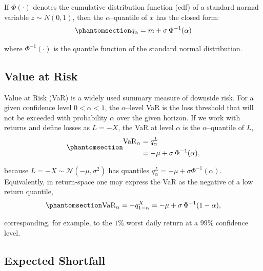 \documentclass[
  letterpaper,
  DIV=11,
  numbers=noendperiod]{scrreprt}
\begin{document}
If \(\Phi(\cdot)\) denotes the cumulative distribution function (cdf) of
a standard normal variable \(z\sim N(0,1)\), then the
\(\alpha\)--quantile of \(x\) has the closed form:
\begin{equation}\protect\phantomsection\label{eq-gen-0069}{  
\begin{align}
    q_{\alpha} = m + \sigma\,\Phi^{-1}(\alpha)
\end{align}
}\end{equation}

where \(\Phi^{-1}(\cdot)\) is the quantile function of the standard
normal distribution.

\subsection*{Value at Risk}\label{value-at-risk}

Value at Risk (VaR) is a widely used summary measure of downside risk.
For a given confidence level \(0<\alpha<1\), the \(\alpha\)--level VaR
is the loss threshold that will not be exceeded with probability
\(\alpha\) over the given horizon. If we work with returns and define
losses as \(L=-X\), the VaR at level \(\alpha\) is the
\(\alpha\)--quantile of \(L\),
\begin{equation}\protect\phantomsection\label{eq-gen-0070}{  
\begin{align}
    \mathrm{VaR}_{\alpha} &= q^{L}_{\alpha} \\
                          &= -\mu + \sigma\,\Phi^{-1}(\alpha),
\end{align}
}\end{equation}

because \(L=-X \sim \mathcal{N}(-\mu,\sigma^{2})\) has quantiles
\(q^{L}_{\alpha}=-\mu+\sigma\Phi^{-1}(\alpha)\). Equivalently, in
return-space one may express the VaR as the negative of a low return
quantile, \begin{equation}\protect\phantomsection\label{eq-gen-0071}{ 
\begin{align}
    \mathrm{VaR}_{\alpha} = -q^{X}_{1-\alpha}
                         = -\mu + \sigma\,\Phi^{-1}(1-\alpha),
\end{align}
}\end{equation}

corresponding, for example, to the \(1\%\) worst daily return at a
\(99\%\) confidence level.

\subsection*{Expected Shortfall}\label{expected-shortfall}
\end{document}
